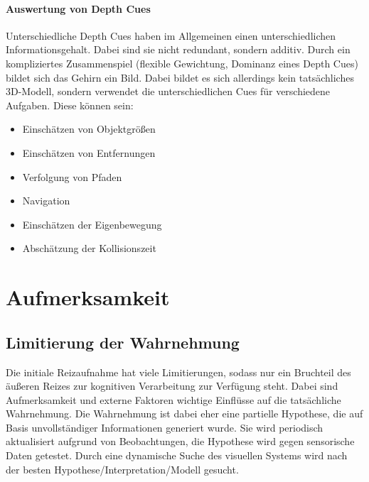 				\paragraph{Auswertung von Depth Cues}
					Unterschiedliche Depth Cues haben im Allgemeinen einen unterschiedlichen Informationsgehalt. Dabei sind sie nicht redundant, sondern additiv. Durch ein kompliziertes Zusammenspiel (flexible Gewichtung, Dominanz eines Depth Cues) bildet sich das Gehirn ein Bild. Dabei bildet es sich allerdings kein tatsächliches 3D-Modell, sondern verwendet die unterschiedlichen Cues für verschiedene Aufgaben. Diese können \zB sein:
					\begin{itemize}
						\item Einschätzen von Objektgrößen
						\item Einschätzen von Entfernungen
						\item Verfolgung von Pfaden
						\item Navigation
						\item Einschätzen der Eigenbewegung
						\item Abschätzung der Kollisionszeit
					\end{itemize}

	\section{Aufmerksamkeit}
		\subsection{Limitierung der Wahrnehmung}
			Die initiale Reizaufnahme hat viele Limitierungen, sodass nur ein Bruchteil des äußeren Reizes zur kognitiven Verarbeitung zur Verfügung steht. Dabei sind Aufmerksamkeit und externe Faktoren wichtige Einflüsse auf die tatsächliche Wahrnehmung. Die Wahrnehmung ist dabei eher eine partielle Hypothese, die auf Basis unvollständiger Informationen generiert wurde. Sie wird periodisch aktualisiert aufgrund von Beobachtungen, \dh die Hypothese wird gegen sensorische Daten getestet. Durch eine dynamische Suche des visuellen Systems wird nach der besten Hypothese/Interpretation/Modell gesucht.

